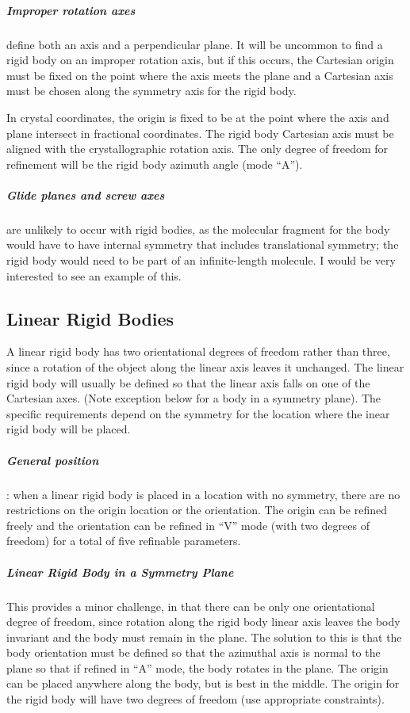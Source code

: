 \subparagraph{Improper rotation axes} define both an axis and a perpendicular plane. It will be uncommon to find a rigid body on an improper rotation axis, but if this occurs, the Cartesian origin must be fixed on the point where the axis meets the plane and a Cartesian axis must be chosen along the symmetry axis for the rigid body. 

In crystal coordinates,  the origin is fixed to be at the point where the axis and plane intersect in fractional coordinates. The rigid body Cartesian axis must be aligned with the crystallographic rotation axis.  The only degree of freedom for refinement will be the rigid body azimuth angle (mode ``A'').

\subparagraph{Glide planes and screw axes} are unlikely to occur with rigid bodies, as the molecular fragment for the body would have to have internal symmetry that includes translational symmetry; the rigid body would need to be part of an infinite-length molecule. I would be very interested to see an example of this. 

\subsection{Linear Rigid Bodies}

A linear rigid body has two orientational degrees of freedom rather than three, since a rotation of the object along the linear axis leaves it unchanged. The linear rigid body will usually be defined so that the linear axis falls on one of the Cartesian axes. (Note exception below for a body in a symmetry plane). 
The specific requirements depend on the symmetry for the location where the inear rigid body will be placed. 

\subparagraph{General position}: when a linear rigid body is placed in a location with no symmetry, there are no restrictions on the origin location or the orientation. The origin can be refined freely and the orientation can be refined in ``V'' mode (with two degrees of freedom) for a total of five refinable parameters. 

\subparagraph{Linear Rigid Body in a Symmetry Plane} 
This provides a minor challenge, in that there can be only one orientational degree of freedom, since rotation along the rigid body linear axis leaves the body invariant and the body must remain in the plane. The solution to this is that the body orientation must be defined so that the azimuthal axis is normal to the plane so that if refined in ``A'' mode, the body rotates in the plane. The origin can be placed anywhere along the body, but is best in the middle. The origin for the rigid body will have two degrees of freedom (use appropriate constraints). 

